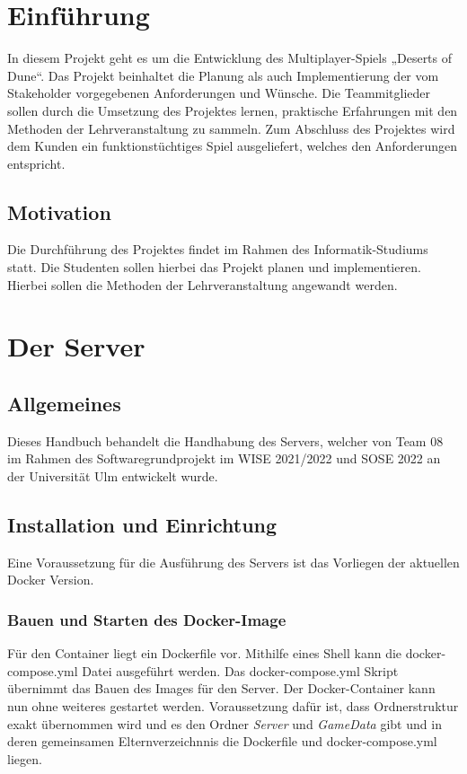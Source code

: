 \documentclass[12pt]{article}
\begin{document}
\tableofcontents
\thispagestyle{empty}

\newpage

\pagestyle{fancy}

\fancyhead[R]{\thepage}
\fancyhead[L]{\leftmark}
\fancyfoot{}


\section{Einführung}

In diesem Projekt geht es um die Entwicklung des Multiplayer-Spiels „Deserts of Dune“.
Das Projekt beinhaltet die Planung als auch Implementierung der vom Stakeholder vorgegebenen
Anforderungen und Wünsche. Die Teammitglieder sollen durch die Umsetzung des Projektes lernen, praktische Erfahrungen mit den Methoden der Lehrveranstaltung zu sammeln. Zum Abschluss des Projektes wird dem Kunden ein funktionstüchtiges Spiel ausgeliefert, welches den Anforderungen entspricht.


\subsection{Motivation}

Die Durchführung des Projektes findet im Rahmen des Informatik-Studiums statt. Die Studenten sollen hierbei das Projekt planen und implementieren. Hierbei sollen die Methoden der Lehrveranstaltung angewandt werden.

\newpage


\section{Der Server}

\subsection{Allgemeines}
Dieses Handbuch behandelt die Handhabung des Servers, welcher von Team 08 im Rahmen des Softwaregrundprojekt im
WISE 2021/2022 und SOSE 2022 an der Universität Ulm entwickelt wurde.

\subsection{Installation und Einrichtung}
Eine Voraussetzung für die Ausführung des Servers ist das Vorliegen der aktuellen Docker Version.

\subsubsection{Bauen und Starten des Docker-Image}
Für den Container liegt ein Dockerfile vor. Mithilfe eines Shell kann die docker-compose.yml Datei ausgeführt werden. Das docker-compose.yml Skript übernimmt das Bauen des Images für den Server. Der Docker-Container kann nun ohne weiteres gestartet werden. 
Voraussetzung dafür ist, dass Ordnerstruktur exakt übernommen wird und es den Ordner \textit{Server} und \textit{GameData} gibt und in deren gemeinsamen Elternverzeichnnis die Dockerfile und docker-compose.yml liegen.
\end{document}
